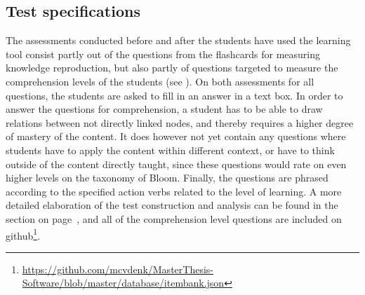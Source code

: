\subsection{Test specifications}

The assessments conducted before and after the students have used the learning tool consist partly out of the questions from the flashcards for measuring knowledge reproduction, but also partly of questions targeted to measure the comprehension levels of the students (see ). On both assessments for all questions, the students are asked to fill in an answer in a text box. In order to answer the questions for comprehension, a student has to be able to draw relations between not directly linked nodes, and thereby requires a higher degree of mastery of the content. It does however not yet contain any questions where students have to apply the content within different context, or have to think outside of the content directly taught, since these questions would rate on even higher levels on the taxonomy of Bloom. Finally, the questions are phrased according to the specified action verbs related to the level of learning. A more detailed elaboration of the test construction and analysis can be found in the  section on page~\pageref{sec:instrumentation}, and all of the comprehension level questions are included on github\footnote{\url{https://github.com/mcvdenk/MasterThesis-Software/blob/master/database/itembank.json}}.
